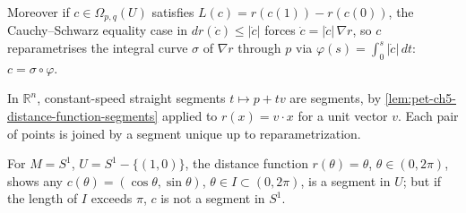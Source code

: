 \begin{remark}
  \label{rem:pet-ch5-distance-function-rigidity}
  \notready
  Moreover if $c\in\Omega_{p,q}(U)$ satisfies $L(c)=r(c(1))-r(c(0))$, the
  Cauchy–Schwarz equality case in $dr(\dot c)\le|\dot c|$ forces
  $\dot c=|\dot c|\,\nabla r$, so $c$ reparametrises the integral curve $\sigma$
  of $\nabla r$ through $p$ via $\varphi(s)=\int_0^s|\dot c|\,dt$:
  $c=\sigma\circ\varphi$.
\end{remark}

\begin{example}
  \label{ex:pet-ch5-euclidean-segments}
  In $\mathbb R^n$, constant-speed straight segments $t\mapsto p+tv$ are segments, by
  \cref{lem:pet-ch5-distance-function-segments} applied to $r(x)=v\cdot x$ for a unit
  vector $v$. Each pair of points is joined by a segment unique up to
  reparametrization.
\end{example}

\begin{example}
  \label{ex:pet-ch5-circle-segment}
  For $M=S^1$, $U=S^1-\{(1,0)\}$, the distance function $r(\theta)=\theta$,
  $\theta\in(0,2\pi)$, shows any $c(\theta)=(\cos\theta,\sin\theta)$, $\theta\in
  I\subset(0,2\pi)$, is a segment in $U$; but if the length of $I$ exceeds $\pi$,
  $c$ is not a segment in $S^1$.
\end{example}

